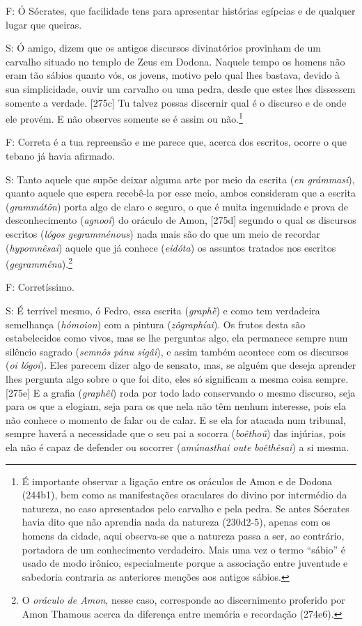 F: Ó Sócrates, que facilidade tens para apresentar histórias egípcias e
de qualquer lugar que queiras.

S: Ó amigo, dizem que os antigos discursos divinatórios provinham de um
carvalho situado no templo de Zeus em Dodona. Naquele tempo os homens
não eram tão sábios quanto vós, os jovens, motivo pelo qual lhes
bastava, devido à sua simplicidade, ouvir um carvalho ou uma pedra,
desde que estes lhes dissessem somente a verdade. {[}275c{]} Tu talvez
possas discernir qual é o discurso e de onde ele provém. E não observes
somente se é assim ou não.\footnote{É importante observar a ligação
  entre os oráculos de Amon e de Dodona (244b1), bem como as
  manifestações oraculares do divino por intermédio da natureza, no caso
  apresentados pelo carvalho e pela pedra. Se antes Sócrates havia dito
  que não aprendia nada da natureza (230d2-5), apenas com os homens da
  cidade, aqui observa-se que a natureza passa a ser, ao contrário,
  portadora de um conhecimento verdadeiro. Mais uma vez o termo
  ``sábio'' é usado de modo irônico, especialmente porque a associação
  entre juventude e sabedoria contraria as anteriores menções aos
  antigos sábios.}

F: Correta é a tua repreensão e me parece que, acerca dos escritos,
ocorre o que tebano já havia afirmado.

S: Tanto aquele que supõe deixar alguma arte por meio da escrita
(\emph{en grámmasi}), quanto aquele que espera recebê-la por esse meio,
ambos consideram que a escrita (\emph{grammátôn}) porta algo de claro e
seguro, o que é muita ingenuidade e prova de desconhecimento
(\emph{agnooî}) do oráculo de Amon, {[}275d{]} segundo o qual os
discursos escritos (\emph{lógos gegramménous}) nada mais são do que um
meio de recordar (\emph{hypomnêsai}) aquele que já conhece
(\emph{eidóta}) os assuntos tratados nos escritos
(\emph{gegramména}).\footnote{O \emph{oráculo de Amon}, nesse caso,
  corresponde ao discernimento proferido por Amon Thamous acerca da
  diferença entre memória e recordação (274e6).}

F: Corretíssimo.

S: É terrível mesmo, ó Fedro, essa escrita (\emph{graphḕ}) e como tem
verdadeira semelhança (\emph{hómoion}) com a pintura
(\emph{zôgraphíai}). Os frutos desta são estabelecidos como vivos, mas
se lhe perguntas algo, ela permanece sempre num silêncio sagrado
(\emph{semnôs pánu sigâi}), e assim também acontece com os discursos
(\emph{oi lógoi}). Eles parecem dizer algo de sensato, mas, se alguém
que deseja aprender lhes pergunta algo sobre o que foi dito, eles só
significam a mesma coisa sempre. {[}275e{]} E a grafia (\emph{graphêi})
roda por todo lado conservando o mesmo discurso, seja para os que a
elogiam, seja para os que nela não têm nenhum interesse, pois ela não
conhece o momento de falar ou de calar. E se ela for atacada num
tribunal, sempre haverá a necessidade que o seu pai a socorra
(\emph{boêthoû}) das injúrias, pois ela não é capaz de defender ou
socorrer (\emph{amúnasthai oute boêthêsai}) a si mesma.

